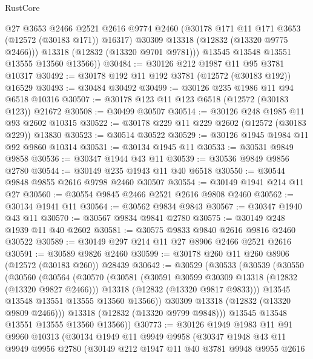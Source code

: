 \begin{lexlean}{RustCore}
\begin{coremodule}
            @27
            @3653
            @2466
            @2521
            @2616
            @9774
            @2460
            (@30178 @171 @11 @171 @3653 (@12572 (@30183 @171)) @16317)
            @30309
            @13318
            (@12832 (@13320 @9775 @2466)))
          @13318
          (@12832 (@13320 @9701 @9781)))
        @13545
        @13548
        @13551
        @13555
        @13560
        @13566))
@30484 := @30126 @212 @1987 @11 @95 @3781 @10317
@30492 := @30178 @192 @11 @192 @3781 (@12572 (@30183 @192)) @16529
@30493 := @30484 @30492
@30499 := @30126 @235 @1986 @11 @94 @6518 @10316
@30507 := @30178 @123 @11 @123 @6518 (@12572 (@30183 @123)) @21672
@30508 := @30499 @30507
@30514 := @30126 @248 @1985 @11 @93 @2602 @10315
@30522 := @30178 @229 @11 @229 @2602 (@12572 (@30183 @229)) @13830
@30523 := @30514 @30522
@30529 := @30126 @1945 @1984 @11 @92 @9860 @10314
@30531 := @30134 @1945 @11
@30533 := @30531 @9849 @9858
@30536 := @30347 @1944 @43 @11
@30539 := @30536 @9849 @9856 @2780
@30544 := @30149 @235 @1943 @11 @40 @6518
@30550 := @30544 @9848 @9855 @2616 @9798 @2460 @30507
@30554 := @30149 @1941 @214 @11 @27
@30560 := @30554 @9845 @2466 @2521 @2616 @9808 @2460
@30562 := @30134 @1941 @11
@30564 := @30562 @9834 @9843
@30567 := @30347 @1940 @43 @11
@30570 := @30567 @9834 @9841 @2780
@30575 := @30149 @248 @1939 @11 @40 @2602
@30581 := @30575 @9833 @9840 @2616 @9816 @2460 @30522
@30589 := @30149 @297 @214 @11 @27 @8906 @2466 @2521 @2616
@30591 := @30589 @9826 @2460
@30599 := @30178 @260 @11 @260 @8906 (@12572 (@30183 @260)) @28439
@30642 := @30529
    (@30533
      (@30539
        (@30550
          (@30560
            (@30564
              (@30570
                (@30581
                  (@30591 @30599 @30309 @13318 (@12832 (@13320 @9827 @2466)))
                  @13318
                  (@12832 (@13320 @9817 @9833)))
                @13545
                @13548
                @13551
                @13555
                @13560
                @13566))
            @30309
            @13318
            (@12832 (@13320 @9809 @2466)))
          @13318
          (@12832 (@13320 @9799 @9848)))
        @13545
        @13548
        @13551
        @13555
        @13560
        @13566))
@30773 := @30126
    @1949
    @1983
    @11
    @91
    @9960
    @10313
    (@30134
      @1949
      @11
      @9949
      @9958
      (@30347
        @1948
        @43
        @11
        @9949
        @9956
        @2780
        (@30149
          @212
          @1947
          @11
          @40
          @3781
          @9948
          @9955
          @2616

\end{coremodule}
\end{lexlean}
